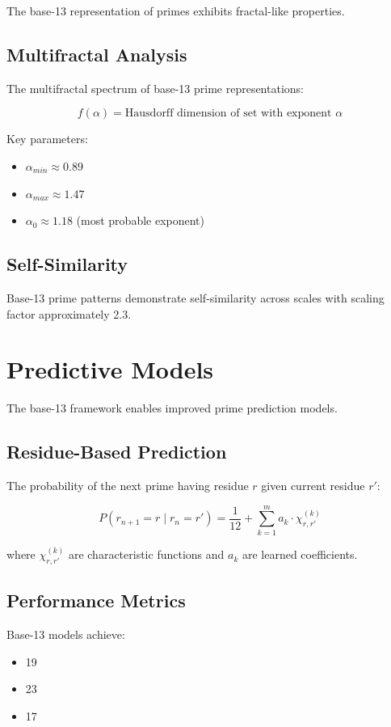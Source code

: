 \documentclass[12pt,a4paper]{report}
\begin{document}
The base-13 representation of primes exhibits fractal-like properties.

\subsection{Multifractal Analysis}

The multifractal spectrum of base-13 prime representations:

\[
f(\alpha) = \text{Hausdorff dimension of set with exponent } \alpha
\]

Key parameters:
\begin{itemize}
\item $\alpha_{min} \approx 0.89$
\item $\alpha_{max} \approx 1.47$
\item $\alpha_0 \approx 1.18$ (most probable exponent)
\end{itemize}

\subsection{Self-Similarity}

Base-13 prime patterns demonstrate self-similarity across scales with scaling factor approximately 2.3.

\section{Predictive Models}

The base-13 framework enables improved prime prediction models.

\subsection{Residue-Based Prediction}

The probability of the next prime having residue $r$ given current residue $r'$:

\[
P(r_{n+1} = r \mid r_n = r') = \frac{1}{12} + \sum_{k=1}^{m} a_k \cdot \chi_{r,r'}^{(k)}
\]

where $\chi_{r,r'}^{(k)}$ are characteristic functions and $a_k$ are learned coefficients.

\subsection{Performance Metrics}

Base-13 models achieve:
\begin{itemize}
\item 19%
\item 23%
\item 17%
\end{itemize}
\end{document}
